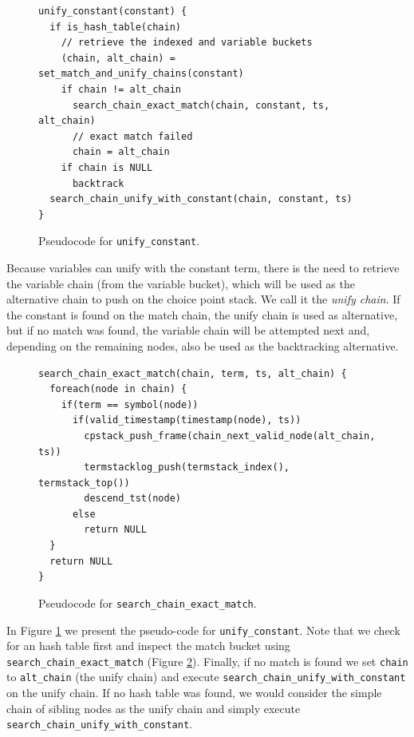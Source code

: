 \begin{figure}[H]
\begin{Verbatim}[fontsize=\small]
unify_constant(constant) {
  if is_hash_table(chain)
    // retrieve the indexed and variable buckets
    (chain, alt_chain) = set_match_and_unify_chains(constant)
    if chain != alt_chain
      search_chain_exact_match(chain, constant, ts, alt_chain)
      // exact match failed
      chain = alt_chain
    if chain is NULL
      backtrack
  search_chain_unify_with_constant(chain, constant, ts)
}
\end{Verbatim}
\caption{Pseudo\-code for \texttt{unify\_constant}.}
\label{fig:unify_constant}
\end{figure}

Because variables can unify with the constant term, there is the need to retrieve the variable chain (from the variable bucket), which will be used as the alternative chain to push on the choice point stack. We call it the \textit{unify chain}. If the constant is found on the match chain, the unify chain is used as alternative, but if no match was found, the variable chain will be attempted next and, depending on the remaining nodes, also be used as the backtracking alternative.

\begin{figure}[H]
\begin{Verbatim}[fontsize=\small]
search_chain_exact_match(chain, term, ts, alt_chain) {
  foreach(node in chain) {
    if(term == symbol(node))
      if(valid_timestamp(timestamp(node), ts))
        cpstack_push_frame(chain_next_valid_node(alt_chain, ts))
        termstacklog_push(termstack_index(), termstack_top())
        descend_tst(node)
      else
        return NULL
  }
  return NULL
}
\end{Verbatim}
\caption{Pseudo\-code for \texttt{search\_chain\_exact\_match}.}
\label{fig:search_chain_exact_match}
\end{figure}

In Figure \ref{fig:unify_constant} we present the pseudo-code for \texttt{unify\_constant}. Note that we check for an hash table first and inspect the match bucket using \texttt{search\_chain\_exact\_match} (Figure \ref{fig:search_chain_exact_match}).
Finally, if no match is found we set \texttt{chain} to \texttt{alt\_chain} (the unify chain) and execute \texttt{search\_chain\_unify\_with\_constant} on the unify chain. If no hash table was found, we would consider the simple chain of sibling nodes as the unify chain and simply execute \texttt{search\_chain\_unify\_with\_constant}.

